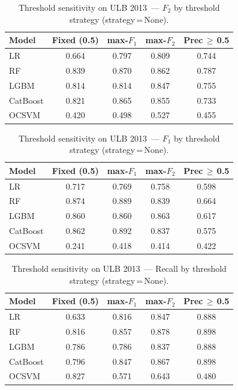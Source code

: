 \begin{table}[ht]
\centering
\caption{Threshold sensitivity on ULB 2013~--- $F_2$ by threshold strategy (strategy\,=\,None).}
\label{tab:threshold_ulb_f2}
\begin{tabular}{l c c c c}
\toprule
Model & Fixed (0.5) & max-$F_1$ & max-$F_2$ & Prec\,$\geq$\,0.5 \\
\midrule
LR         & 0.664 & 0.797 & 0.809 & 0.744 \\
RF         & 0.839 & 0.870 & 0.862 & 0.787 \\
LGBM       & 0.814 & 0.814 & 0.847 & 0.755 \\
CatBoost   & 0.821 & 0.865 & 0.855 & 0.733 \\
OCSVM      & 0.420 & 0.498 & 0.527 & 0.455 \\
\bottomrule
\end{tabular}
\end{table}

\begin{table}[ht]
\centering
\caption{Threshold sensitivity on ULB 2013~--- $F_1$ by threshold strategy (strategy\,=\,None).}
\label{tab:threshold_ulb_f1}
\begin{tabular}{l c c c c}
\toprule
Model & Fixed (0.5) & max-$F_1$ & max-$F_2$ & Prec\,$\geq$\,0.5 \\
\midrule
LR         & 0.717 & 0.769 & 0.758 & 0.598 \\
RF         & 0.874 & 0.889 & 0.839 & 0.664 \\
LGBM       & 0.860 & 0.860 & 0.863 & 0.617 \\
CatBoost   & 0.862 & 0.892 & 0.837 & 0.575 \\
OCSVM      & 0.241 & 0.418 & 0.414 & 0.422 \\
\bottomrule
\end{tabular}
\end{table}

\begin{table}[ht]
\centering
\caption{Threshold sensitivity on ULB 2013~--- Recall by threshold strategy (strategy\,=\,None).}
\label{tab:threshold_ulb_recall}
\begin{tabular}{l c c c c}
\toprule
Model & Fixed (0.5) & max-$F_1$ & max-$F_2$ & Prec\,$\geq$\,0.5 \\
\midrule
LR         & 0.633 & 0.816 & 0.847 & 0.888 \\
RF         & 0.816 & 0.857 & 0.878 & 0.898 \\
LGBM       & 0.786 & 0.786 & 0.837 & 0.888 \\
CatBoost   & 0.796 & 0.847 & 0.867 & 0.898 \\
OCSVM      & 0.827 & 0.571 & 0.643 & 0.480 \\
\bottomrule
\end{tabular}
\end{table}

